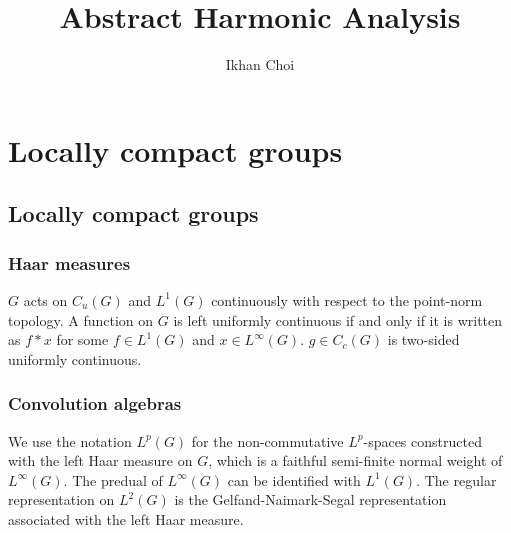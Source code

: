 \documentclass{../../large}
\begin{document}
\title{Abstract Harmonic Analysis}
\author{Ikhan Choi}
\maketitle
\tableofcontents



\part{Locally compact groups}




\chapter{Locally compact groups}


\section{Haar measures}


\begin{prb}
\end{prb}

\begin{prb}
\end{prb}

\begin{prb}
\end{prb}

\begin{prb}
$G$ acts on $C_u(G)$ and $L^1(G)$ continuously with respect to the point-norm topology.
A function on $G$ is left uniformly continuous if and only if it is written as $f*x$ for some $f\in L^1(G)$ and $x\in L^\infty(G)$.
$g\in C_c(G)$ is two-sided uniformly continuous.
\end{prb}




\section{Convolution algebras}

We use the notation $L^p(G)$ for the non-commutative $L^p$-spaces constructed with the left Haar measure on $G$, which is a faithful semi-finite normal weight of $L^\infty(G)$.
The predual of $L^\infty(G)$ can be identified with $L^1(G)$.
The regular representation on $L^2(G)$ is the Gelfand-Naimark-Segal representation associated with the left Haar measure.
\end{document}
